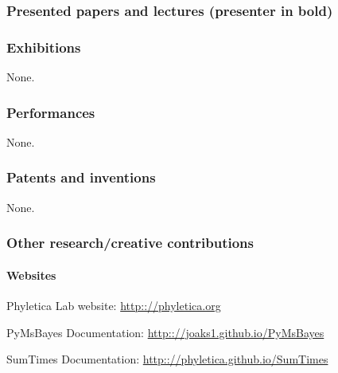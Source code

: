 \subsubsection{Presented papers and lectures (presenter in bold)}






\subsubsection{Exhibitions}
None.

\subsubsection{Performances}
None.

\subsubsection{Patents and inventions}
None.

\subsubsection{Other research/creative contributions}
 
\paragraph{Websites}
\begin{tightItemize}
    \item Phyletica Lab website: \url{http:://phyletica.org}
    \item PyMsBayes Documentation: \url{http:://joaks1.github.io/PyMsBayes}
    \item SumTimes Documentation: \url{http:://phyletica.github.io/SumTimes}
\end{tightItemize}

